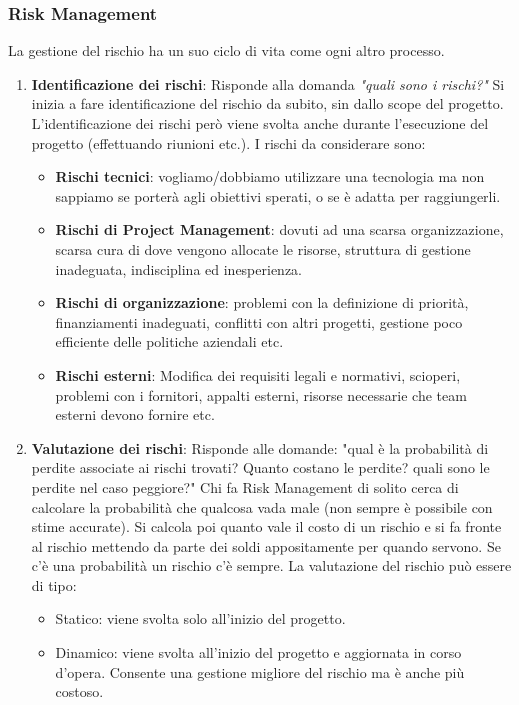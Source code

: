 \subsubsection{Risk Management}
La gestione del rischio ha un suo ciclo di vita come ogni altro processo.
\begin{enumerate}
	\item \textbf{Identificazione dei rischi}: Risponde alla domanda \textit{"quali sono i rischi?"}\newline
	Si inizia a fare identificazione del rischio da subito, sin dallo scope del progetto. L'identificazione dei rischi però viene svolta anche durante l'esecuzione del progetto (effettuando riunioni etc.). I rischi da considerare sono:
	\begin{itemize}
		\item \textbf{Rischi tecnici}: vogliamo/dobbiamo utilizzare una tecnologia ma non sappiamo se porterà agli obiettivi sperati, o se è adatta per raggiungerli.
		\item \textbf{Rischi di Project Management}: dovuti ad una scarsa organizzazione, scarsa cura di dove vengono allocate le risorse, struttura di gestione inadeguata, indisciplina ed inesperienza.
		\item \textbf{Rischi di organizzazione}: problemi con la definizione di priorità, finanziamenti inadeguati, conflitti con altri progetti, gestione poco efficiente delle politiche aziendali etc.
		\item \textbf{Rischi esterni}: Modifica dei requisiti legali e normativi, scioperi, problemi con i fornitori, appalti esterni, risorse necessarie che team esterni devono fornire etc.
	\end{itemize}
	\item \textbf{Valutazione dei rischi}: Risponde alle domande: "qual è la probabilità di perdite associate ai rischi trovati? Quanto costano le perdite? quali sono le perdite nel caso peggiore?"\newline
	Chi fa Risk Management di solito cerca di calcolare la probabilità che qualcosa vada male (non sempre è possibile con stime accurate). Si calcola poi quanto vale il costo di un rischio e si fa fronte al rischio mettendo da parte dei soldi appositamente per quando servono. Se c'è una probabilità un rischio c'è sempre. La valutazione del rischio può essere di tipo:
	\begin{itemize}
		\item Statico: viene svolta solo all'inizio del progetto.
		\item Dinamico: viene svolta all'inizio del progetto e aggiornata in corso d'opera. Consente una gestione migliore del rischio ma è anche più costoso.

\end{itemize}
\end{enumerate}
